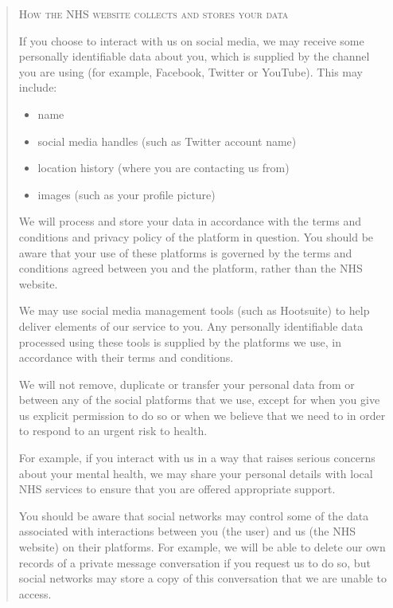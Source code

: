 \documentclass[twocolumn, letterpaper,13pt]{scrartcl}
\begin{document}
\begin{quote}
        \textsc{How the NHS website collects and stores your data}
        
        If you choose to interact with us on social media, we may receive some personally identifiable data about you, which is supplied by the channel you are using (for example, Facebook, Twitter or YouTube). This may include:
        
        \begin{itemize}
            \item name
            \item social media handles (such as Twitter account name)
            \item location history (where you are contacting us from)
            \item images (such as your profile picture)
        \end{itemize}
        
        We will process and store your data in accordance with the terms and conditions and privacy policy of the platform in question. You should be aware that your use of these platforms is governed by the terms and conditions agreed between you and the platform, rather than the NHS website.
        
        We may use social media management tools (such as Hootsuite) to help deliver elements of our service to you. Any personally identifiable data processed using these tools is supplied by the platforms we use, in accordance with their terms and conditions.
        
        We will not remove, duplicate or transfer your personal data from or between any of the social platforms that we use, except for when you give us explicit permission to do so or when we believe that we need to in order to respond to an urgent risk to health.
        
        For example, if you interact with us in a way that raises serious concerns about your mental health, we may share your personal details with local NHS services to ensure that you are offered appropriate support.
        
        You should be aware that social networks may control some of the data associated with interactions between you (the user) and us (the NHS website) on their platforms. For example, we will be able to delete our own records of a private message conversation if you request us to do so, but social networks may store a copy of this conversation that we are unable to access.
        

\end{quote}
\end{document}
